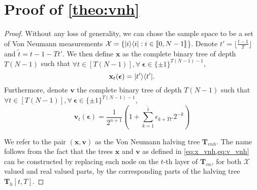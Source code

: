 
\section{Proof of \cref{theo:vnh}}\label{pf:vnh}

\begin{proof}
Without any loss of generality, we can chose the sample space to be a set of Von Neumann measurements $\mathcal{X} = \{ | i \rangle \langle i |: i \in \llbracket 0, N-1 \rrbracket$\}. Denote $t'=\lfloor \frac {t-1} T \rfloor$ and $\tilde t=t-1-Tt'$. We then define $\mathbf{x}$ as the complete binary tree of depth $T(N-1)$ such that $\forall t\in[T(N-1)],\forall \ \boldsymbol{\epsilon} \in \{\pm 1\}^{T(N-1)-1}$,
\begin{equation}
\label{eq:x_vnh}
    \mathbf x_t(\boldsymbol\epsilon)=| t' \rangle \langle t' |.
\end{equation}
Furthermore, denote $\mathbf{v}$ the complete binary tree of depth $T(N-1)$ such that $\forall t\in[T(N-1)],\forall \ \boldsymbol{\epsilon} \in \{\pm 1\}^{T(N-1)-1}$,
\begin{equation}
\label{eq:v_vnh}
    \mathbf v_t(\boldsymbol\epsilon)=\frac1{2^{n+1}}(1+\sum_{k=1}^{\tilde t}\epsilon_{k+Tt'}2^{-k})
\end{equation}

We refer to the pair $(\mathbf{x}, \mathbf{v})$ as the Von Neumann halving tree $\mathbf{T}_{vnh}$. The name follows from the fact that the trees $\mathbf{x}$ and $\mathbf{v}$ as defined in \cref{eq:x_vnh,eq:v_vnh} can be constructed by replacing each node on the $t$-th layer of $\mathbf{T}_{vn}$, for both $\mathcal{X}$ valued and real valued parts, by the corresponding parts of the halving tree $\mathbf{T}_h [t, T]$.


\end{proof}
